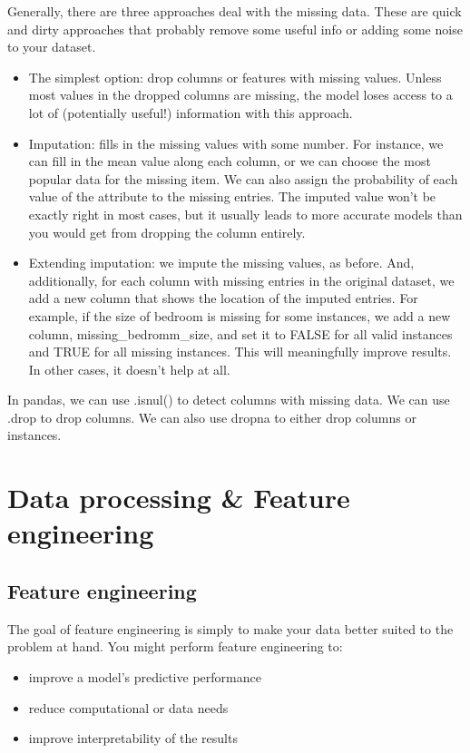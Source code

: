 \documentclass[12pt]{report}
\begin{document}
Generally, there are three approaches deal with the missing data. These are quick and dirty approaches that probably remove some useful info or adding some noise to your dataset.
\begin{itemize}
  \item The simplest option: drop columns or features with missing values. Unless most values in the dropped columns are missing, the model loses access to a lot of (potentially useful!) information with this approach.
  \item Imputation: fills in the missing values with some number. For instance, we can fill in the mean value along each column, or we can choose the most popular data for the missing item. We can also assign the probability of each value of the attribute to the missing entries. The imputed value won't be exactly right in most cases, but it usually leads to more accurate models than you would get from dropping the column entirely.
  \item Extending imputation: we impute the missing values, as before. And, additionally, for each column with missing entries in the original dataset, we add a new column that shows the location of the imputed entries. For example, if the size of bedroom is missing for some instances, we add a new column, missing\_bedromm\_size, and set it to FALSE for all valid instances and TRUE for all missing instances. This will meaningfully improve results. In other cases, it doesn't help at all.
\end{itemize}

In pandas, we can use .isnul() to detect columns with missing data. We can use .drop to drop columns. We can also use dropna to either drop columns or instances.

\section{Data processing \& Feature engineering}
\label{sec:featureEngineering}

\subsection{Feature engineering}
The goal of feature engineering is simply to make your data better suited to the problem at hand. You might perform feature engineering to:
\begin{itemize}
  \item improve a model's predictive performance
  \item reduce computational or data needs
  \item improve interpretability of the results
\end{itemize}
\end{document}

